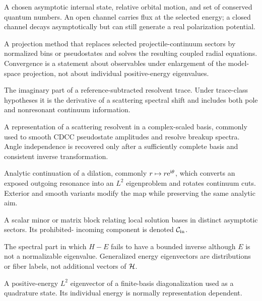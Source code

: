 \begin{description}[style=nextline]
  \item[Channel.]
  A chosen asymptotic internal state, relative orbital motion, and set of
  conserved quantum numbers.  An open channel carries flux at the selected
  energy; a closed channel decays asymptotically but can still generate a real
  polarization potential.

  \item[Continuum-discretized coupled channels (CDCC).]
  A projection method that replaces selected projectile-continuum sectors by
  normalized bins or pseudostates and solves the resulting coupled radial
  equations.  Convergence is a statement about observables under enlargement
  of the model-space projection, not about individual positive-energy
  eigenvalues.

  \item[Continuum level density (CLD).]
  The imaginary part of a reference-subtracted resolvent trace.  Under
  trace-class hypotheses it is the derivative of a scattering spectral shift
  and includes both pole and nonresonant continuum information.

  \item[Complex-scaled Lippmann--Schwinger method (CSLS).]
  A representation of a scattering resolvent in a complex-scaled basis,
  commonly used to smooth CDCC pseudostate amplitudes and resolve breakup
  spectra.  Angle independence is recovered only after a sufficiently
  complete basis and consistent inverse transformation.

  \item[Complex scaling.]
  Analytic continuation of a dilation, commonly $r\mapsto r\mathrm{e}^{\mathrm{i}\theta}$,
  which converts an exposed outgoing resonance into an $L^2$ eigenproblem and
  rotates continuum cuts.  Exterior and smooth variants modify the map while
  preserving the same analytic aim.

  \item[Connection coefficient.] A scalar minor or matrix block relating
  local solution bases in distinct asymptotic sectors.  Its prohibited-
  incoming component is denoted $\mathcal{C}_{\mathrm{in}}$.

  \item[Continuous spectrum.]
  The spectral part in which $H-E$ fails to have a bounded inverse although
  $E$ is not a normalizable eigenvalue.  Generalized energy eigenvectors are
  distributions or fiber labels, not additional vectors of $\mathcal{H}$.

  \item[Continuum pseudostate.] A positive-energy $L^2$ eigenvector of a
  finite-basis diagonalization used as a quadrature state.  Its individual
  energy is normally representation dependent.


\end{description}
